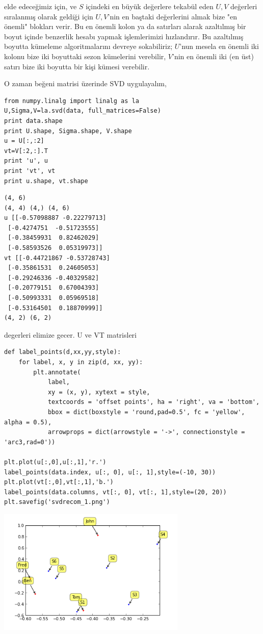 \documentclass[12pt,fleqn]{article}\usepackage{../../common}
\begin{document}
elde edeceğimiz için, ve $S$ içindeki en büyük değerlere tekabül eden
$U,V$ değerleri sıralanmış olarak geldiği için $U,V$'nin en baştaki
değerlerini almak bize "en önemli" blokları verir. Bu en önemli kolon
ya da satırları alarak azaltılmış bir boyut içinde benzerlik hesabı
yapmak işlemlerimizi hızlandırır. Bu azaltılmış boyutta kümeleme
algoritmalarını devreye sokabiliriz; $U$'nun mesela en önemli iki
kolonu bize iki boyuttaki sezon kümelerini verebilir, $V$'nin en
önemli iki (en üst) satırı bize iki boyutta bir kişi kümesi verebilir.

O zaman beğeni matrisi üzerinde SVD uygulayalım,

\begin{verbatim}
from numpy.linalg import linalg as la
U,Sigma,V=la.svd(data, full_matrices=False)
print data.shape
print U.shape, Sigma.shape, V.shape
u = U[:,:2]
vt=V[:2,:].T
print 'u', u
print 'vt', vt
print u.shape, vt.shape
\end{verbatim}

\begin{verbatim}
(4, 6)
(4, 4) (4,) (4, 6)
u [[-0.57098887 -0.22279713]
 [-0.4274751  -0.51723555]
 [-0.38459931  0.82462029]
 [-0.58593526  0.05319973]]
vt [[-0.44721867 -0.53728743]
 [-0.35861531  0.24605053]
 [-0.29246336 -0.40329582]
 [-0.20779151  0.67004393]
 [-0.50993331  0.05969518]
 [-0.53164501  0.18870999]]
(4, 2) (6, 2)
\end{verbatim}

degerleri elimize gecer. U ve VT matrisleri 

\begin{verbatim}
def label_points(d,xx,yy,style):
    for label, x, y in zip(d, xx, yy):
        plt.annotate(
            label, 
            xy = (x, y), xytext = style,
            textcoords = 'offset points', ha = 'right', va = 'bottom',
            bbox = dict(boxstyle = 'round,pad=0.5', fc = 'yellow', alpha = 0.5),
            arrowprops = dict(arrowstyle = '->', connectionstyle = 'arc3,rad=0'))

plt.plot(u[:,0],u[:,1],'r.')
label_points(data.index, u[:, 0], u[:, 1],style=(-10, 30))
plt.plot(vt[:,0],vt[:,1],'b.')
label_points(data.columns, vt[:, 0], vt[:, 1],style=(20, 20))
plt.savefig('svdrecom_1.png')
\end{verbatim}

\includegraphics[height=6cm]{svdrecom_1.png}
\end{document}
